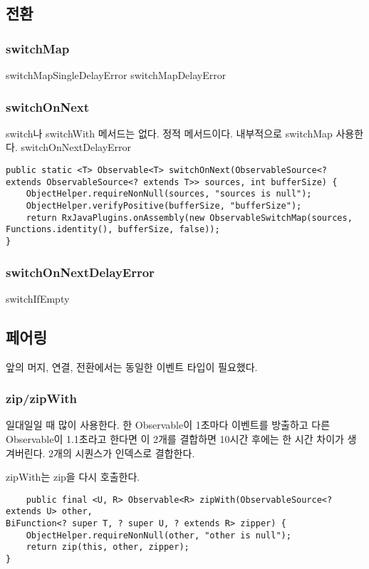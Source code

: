 \documentclass{book}
\begin{document}
{\subsection{전환}
\subsubsection{switchMap}
switchMapSingleDelayError
switchMapDelayError

\subsubsection{switchOnNext}
switch나 switchWith 메서드는 없다.
정적 메서드이다. 
내부적으로 switchMap 사용한다.
switchOnNextDelayError


\begin{verbatim}
public static <T> Observable<T> switchOnNext(ObservableSource<? extends ObservableSource<? extends T>> sources, int bufferSize) {
	ObjectHelper.requireNonNull(sources, "sources is null");
	ObjectHelper.verifyPositive(bufferSize, "bufferSize");
	return RxJavaPlugins.onAssembly(new ObservableSwitchMap(sources, Functions.identity(), bufferSize, false));
}
\end{verbatim}

\subsubsection{switchOnNextDelayError}

switchIfEmpty


\subsection{페어링}
앞의 머지, 연결, 전환에서는 동일한 이벤트 타입이 필요했다.

\subsubsection{zip/zipWith}
일대일일 때 많이 사용한다.
한 Observable이 1초마다 이벤트를 방출하고 다른 Observable이 1.1초라고 한다면 이 2개를 결합하면 10시간 후에는 한 시간 차이가 생겨버린다.
2개의 시퀀스가 인덱스로 결합한다.

zipWith는 zip을 다시 호출한다.
\begin{verbatim}
    public final <U, R> Observable<R> zipWith(ObservableSource<? extends U> other,
BiFunction<? super T, ? super U, ? extends R> zipper) {
	ObjectHelper.requireNonNull(other, "other is null");
	return zip(this, other, zipper);
}
\end{verbatim}

}
\end{document}
